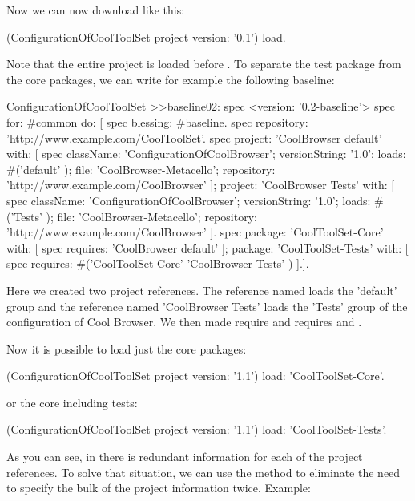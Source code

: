 \documentclass[a4paper,10pt,twoside]{book}
\begin{document}
Now we can now download  like this:

\begin{code}{}
(ConfigurationOfCoolToolSet project version: '0.1') load.
\end{code}

Note that the entire  project is loaded before . To separate the test package from the core packages, we can write for example the following baseline:

\begin{code}{}
ConfigurationOfCoolToolSet >>baseline02: spec 
	<version: '0.2-baseline'>
	spec for: #common do: [
		spec blessing: #baseline.
		spec repository: 'http://www.example.com/CoolToolSet'.
		spec
			project: 'CoolBrowser default' with: [
				spec
					className: 'ConfigurationOfCoolBrowser';
					versionString: '1.0';
					loads: #('default' );
					file: 'CoolBrowser-Metacello';
					repository: 'http://www.example.com/CoolBrowser' ];
			project: 'CoolBrowser Tests' with: [
				spec
					className: 'ConfigurationOfCoolBrowser';
					versionString: '1.0';
					loads: #('Tests' );
					file: 'CoolBrowser-Metacello';
					repository: 'http://www.example.com/CoolBrowser' ].
		spec 
			package: 'CoolToolSet-Core' with: [ spec requires: 'CoolBrowser default' ];
			package: 'CoolToolSet-Tests' with: [ 
				spec requires: #('CoolToolSet-Core'  'CoolBrowser Tests'  ) ].].			
\end{code}

Here we created two project references. The reference named  loads the 'default' group and the reference named 'CoolBrowser Tests'  loads the 'Tests' group of the configuration of Cool Browser. We then made  require  and  requires  and .

Now it is possible to load just the core packages:

\begin{code}{}
(ConfigurationOfCoolToolSet project version: '1.1') load: 'CoolToolSet-Core'.
\end{code} 
or the core including tests:
 
\begin{code}{}
  (ConfigurationOfCoolToolSet project version: '1.1') load: 'CoolToolSet-Tests'.
\end{code}

As you can see, in  there is redundant information for each of the project references. To solve that situation, we can use the  method to eliminate the need to specify the bulk of the project information twice. Example:
\end{document}
